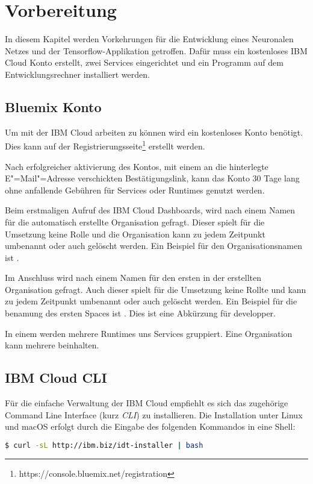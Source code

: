 \section{Vorbereitung}
In diesem Kapitel werden Vorkehrungen für die Entwicklung eines Neuronalen Netzes und der Tensorflow-Applikation
getroffen. Dafür muss ein kostenloses IBM Cloud Konto erstellt, zwei Services eingerichtet und ein Programm auf dem
Entwicklungsrechner installiert werden.

\subsection{Bluemix Konto}
Um mit der IBM Cloud arbeiten zu können wird ein kostenloses Konto benötigt. Dies kann auf der
Registrierungsseite\footnote{https://console.bluemix.net/registration} erstellt werden.

Nach erfolgreicher aktivierung des Kontos, mit einem an die hinterlegte E"=Mail"=Adresse verschickten Bestätigungslink,
kann das Konto 30 Tage lang ohne anfallende Gebühren für Services oder Runtimes genutzt werden.

Beim erstmaligen Aufruf des IBM Cloud Dashboards, wird nach einem Namen für die automatisch erstellte Organisation gefragt.
Dieser spielt für die Umsetzung keine Rolle und die Organisation kann zu jedem Zeitpunkt umbenannt oder auch gelöscht werden.
Ein Beispiel für den Organisationsnamen ist .

Im Anschluss wird nach einem Namen für den ersten  in der erstellten Organisation gefragt. Auch dieser spielt
für die Umsetzung keine Rollte und kann zu jedem Zeitpunkt umbenannt oder auch gelöscht werden. Ein Beispiel für die
benamung des ersten Spaces ist . Dies ist eine Abkürzung für developper.

In einem  werden mehrere Runtimes uns Services gruppiert. Eine Organisation kann mehrere  beinhalten.

\subsection{IBM Cloud CLI}
Für die einfache Verwaltung der IBM Cloud empfiehlt es sich das zugehörige Command Line Interface (kurz \textit{CLI}) zu
installieren. Die Installation unter Linux und macOS erfolgt durch die Eingabe des folgenden Kommandos in eine Shell:

\begin{lstlisting}[language=bash, caption=Installation des IBM Cloud CLI, label=Installation des IBM Cloud CLI]
    $ curl -sL http://ibm.biz/idt-installer | bash
\end{lstlisting}


